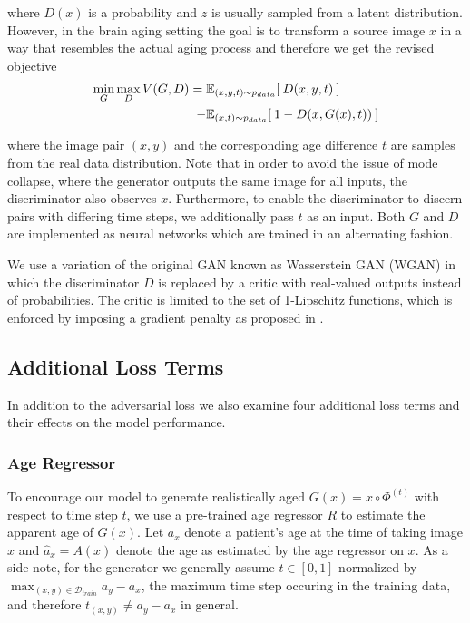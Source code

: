 where $D(x)$ is a probability and $z$ is usually sampled from a latent distribution. However, in the brain aging setting the goal is to transform a source image $x$ in a way that resembles the actual aging process and therefore we get the revised objective
\begin{equation}
	\begin{split}
		\min_G \max_D V(G, D) = \; & \mathbb{E}_{ (x, y, t) \sim p_{data} } [ \: D (x, y, t) \: ] \\
		 - & \mathbb{E}_{ (x, t) \sim p_{data} } [ \: 1 - D (x, G(x), t)) \: ]
	\end{split}
\end{equation}

where the image pair $(x, y)$ and the corresponding age difference $t$ are samples from the real data distribution. Note that in order to avoid the issue of mode collapse, where the generator outputs the same image for all inputs, the discriminator also observes $x$. Furthermore, to enable the discriminator to discern pairs with differing time steps, we additionally pass $t$ as an input. Both $G$ and $D$ are implemented as neural networks which are trained in an alternating fashion. 

We use a variation of the original GAN known as Wasserstein GAN (WGAN) \cite{arjovsky} in which the discriminator $D$ is replaced by a critic with real-valued outputs instead of probabilities. The critic is limited to the set of 1-Lipschitz functions, which is enforced by imposing a gradient penalty as proposed in \cite{gulrajani}.

\subsection{Additional Loss Terms}
In addition to the adversarial loss we also examine four additional loss terms and their effects on the model performance.

\subsubsection*{Age Regressor} \label{sec:adaagereg}
To encourage our model to generate realistically aged $G(x) = x \circ \Phi^{(t)} $ with respect to time step $t$, we use a pre-trained age regressor $R$ to estimate the apparent age of $G(x)$.
Let $ a_x $ denote a patient's age at the time of taking image $x$ and $ \hat a_x = A(x)$ denote the age as estimated by the age regressor on $x$. As a side note, for the generator we generally assume $t \in [0, 1]$ normalized by $\max_{(x, y) \in \mathcal{D}_{train}} a_y - a_x $, the maximum time step occuring in the training data, and therefore $t_{(x, y)} \neq a_y - a_x$ in general.

